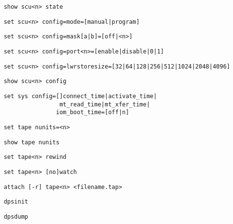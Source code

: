 \documentclass[notitlepage]{report}
\begin{document}
\begin{lstlisting}
	show scu<n> state
\end{lstlisting}

\begin{lstlisting}
	set scu<n> config=mode=[manual|program]
\end{lstlisting}

\begin{lstlisting}
	set scu<n> config=mask[a|b]=[off|<n>]
\end{lstlisting}

\begin{lstlisting}
	set scu<n> config=port<n>=[enable|disable|0|1]
\end{lstlisting}

\begin{lstlisting}
	set scu<n> config=lwrstoresize=[32|64|128|256|512|1024|2048|4096]
\end{lstlisting}

\begin{lstlisting}
	show scu<n> config
\end{lstlisting}

\begin{lstlisting}
	set sys config=[]connect_time|activate_time|
	                mt_read_time|mt_xfer_time|
	               iom_boot_time=[off|n] 
\end{lstlisting}

\begin{lstlisting}
	set tape nunits=<n>
\end{lstlisting}

\begin{lstlisting}
	show tape nunits
\end{lstlisting}

\begin{lstlisting}
	set tape<n> rewind
\end{lstlisting}

\begin{lstlisting}
	set tape<n> [no]watch
\end{lstlisting}

\begin{lstlisting}
	attach [-r] tape<n> <filename.tap>
\end{lstlisting}

\begin{lstlisting}
	dpsinit
\end{lstlisting}

\begin{lstlisting}
	dpsdump
\end{lstlisting}
\end{document}
